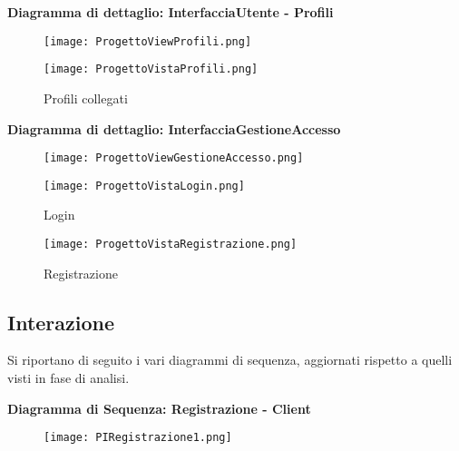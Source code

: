 \textbf{Diagramma di dettaglio: InterfacciaUtente - Profili}
\begin{figure}[h!]
    \begin{center}
        \texttt{[image: ProgettoViewProfili.png]}
    \end{center}
\end{figure}

\begin{figure}[h!]
    \centering
    \texttt{[image: ProgettoVistaProfili.png]}
    \caption{Profili collegati}
\end{figure}

\newpage

\textbf{Diagramma di dettaglio: InterfacciaGestioneAccesso}

\begin{figure}[h!]
    \begin{center}
        \texttt{[image: ProgettoViewGestioneAccesso.png]}
    \end{center}
\end{figure}

\begin{figure}[h!]
    \centering
    \texttt{[image: ProgettoVistaLogin.png]}
    \caption{Login}
\end{figure}
\begin{figure}[h!]
    \centering
    \texttt{[image: ProgettoVistaRegistrazione.png]}
    \caption{Registrazione}
\end{figure}

\clearpage



\subsection{Interazione}


Si riportano di seguito i vari diagrammi di sequenza, aggiornati rispetto a quelli visti in fase di analisi.\\
\vspace{3em}

\textbf{Diagramma di Sequenza: Registrazione - Client}
\begin{figure}[h!]
    \centering
    \texttt{[image: PIRegistrazione1.png]}
\end{figure}

